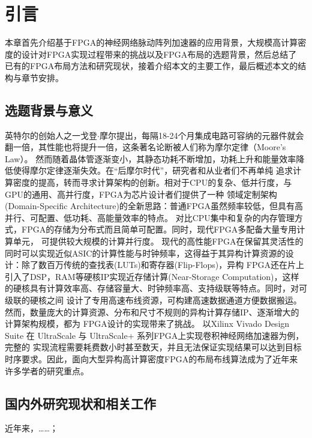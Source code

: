 \chapter{引言}

本章首先介绍基于FPGA的神经网络脉动阵列加速器的应用背景，大规模高计算密度的设计对FPGA实现过程带来的挑战以及FPGA布局的选题背景，然后总结了
已有的FPGA布局方法和研究现状，接着介绍本文的主要工作，最后概述本文的结构与章节安排。

\section{选题背景与意义}

英特尔的创始人之一戈登$\cdot$摩尔提出，每隔18-24个月集成电路可容纳的元器件就会翻一倍，其性能也将提升一倍，这条著名论断被人们称为摩尔定律（Moore's Law）。
然而随着晶体管逐渐变小，其静态功耗不断增加，功耗上升和能量效率降低使得摩尔定律逐渐失效。在“后摩尔时代”，研究者和从业者们不再单纯
追求计算密度的提高，转而寻求计算架构的创新。相对于CPU的复杂、低并行度，与GPU的通用、高并行度，FPGA为芯片设计者们提供了一种
领域定制架构(Domain-Specific Architecture)的全新思路：普通FPGA虽然频率较低，但具有高并行、可配置、低功耗、高能量效率的特点。
对比CPU集中和复杂的内存管理方式，FPGA的存储为分布式而且简单可配置。同时，现代FPGA多配备大量专用计算单元，
可提供较大规模的计算并行度。
现代的高性能FPGA在保留其灵活性的同时可以实现近似ASIC的计算性能与时钟频率，这得益于其异构计算资源的设计：除了数百万传统的查找表(LUTs)和寄存器(Flip-Flops)，异构
FPGA还在片上引入了DSP，RAM等硬核IP实现近存储计算(Near-Storage Computation)，这样的硬核具有计算效率高、存储容量大、时钟频率高、支持级联等特点。同时，对可级联的硬核之间
设计了专用高速布线资源，可构建高速数据通道方便数据搬运。然而，数量庞大的计算资源、分布和尺寸不规则的异构计算存储IP、逐渐增大的计算架构规模，都为
FPGA设计的实现带来了挑战。
以Xilinx Vivado Design Suite 在 UltraScale 与 UltraScale+ 系列FPGA上实现卷积神经网络加速器为例，完整的
实现流程需要耗费数小时甚至数天，并且无法保证实现结果可以达到目标时序要求。因此，面向大型异构高计算密度FPGA的布局布线算法成为了近年来
许多学者的研究重点。


% 

\section{国内外研究现状和相关工作}
\label{sec:related_work}
近年来，……；


